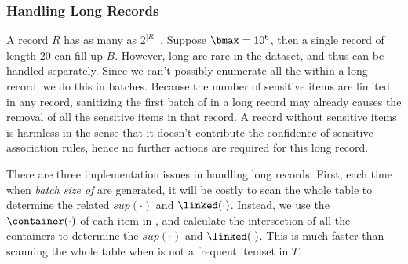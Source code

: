 \subsubsection{Handling Long Records}
\label{sec:handlelong}
A record $R$ has as many as $2^{|R|}$ \qids. Suppose $\bmax = 10^6$, then a
single record of length $20$ can fill up $B$. However, long \qids are rare
in the dataset, and thus can be handled separately. Since
we can't possibly enumerate all the \qids within a long record, we do this in
batches. Because the number of sensitive items are limited in any record,
sanitizing the first batch of \qids in a long record may already causes the
removal of all the sensitive items in that record. A record without sensitive
items is harmless in the sense that it doesn't contribute the confidence
of sensitive association rules,
hence no further actions are required for this long record.

There are three implementation issues in handling long records. First, each
time when {\em batch size of } \qids are generated, it will be costly to scan
the whole table to determine the related $sup(\cdot)$ and
$\linked(\cdot)$. Instead, we use the $\container(\cdot)$ of each item in
\qid, and calculate the intersection of all the containers to determine the
$sup(\cdot)$ and $\linked(\cdot)$. This is much faster than
scanning the whole table when \qid is not a frequent itemset in $T$.

